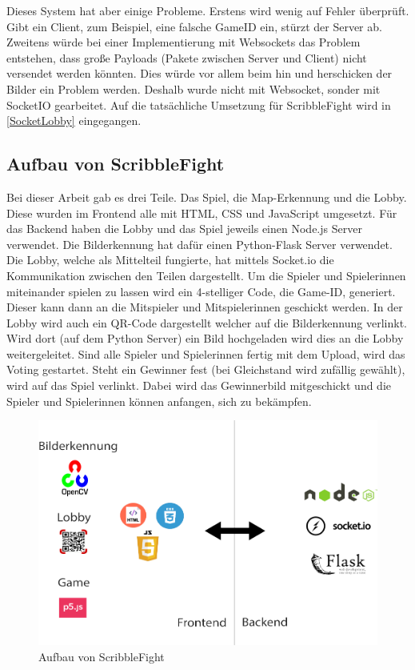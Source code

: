 Dieses System hat aber einige Probleme. Erstens wird wenig auf Fehler überprüft.
Gibt ein Client, zum Beispiel, eine falsche GameID ein, stürzt der Server ab. Zweitens würde bei einer Implementierung mit
Websockets das Problem entstehen, dass große Payloads (Pakete zwischen Server und Client) nicht versendet werden könnten.
Dies würde vor allem beim hin und herschicken der Bilder ein Problem werden. Deshalb wurde
nicht mit Websocket, sonder mit SocketIO gearbeitet. Auf die tatsächliche Umsetzung für ScribbleFight wird in
\ref{SocketLobby} eingegangen.

\subsection{Aufbau von ScribbleFight}
Bei dieser Arbeit gab es drei Teile. Das Spiel, die Map-Erkennung und die Lobby. Diese wurden im Frontend alle mit HTML, CSS und JavaScript umgesetzt.
Für das Backend haben die Lobby und das Spiel jeweils einen Node.js Server verwendet. Die Bilderkennung hat dafür einen Python-Flask Server verwendet. Die Lobby, welche als Mittelteil fungierte, hat mittels Socket.io die Kommunikation zwischen den Teilen dargestellt.
Um die Spieler und Spielerinnen miteinander spielen zu lassen wird ein 4-stelliger Code, die Game-ID, generiert. Dieser kann dann an die Mitspieler und Mitspielerinnen geschickt werden. In der Lobby wird auch ein QR-Code dargestellt welcher auf die Bilderkennung verlinkt.
Wird dort (auf dem Python Server) ein Bild hochgeladen wird dies an die Lobby weitergeleitet. Sind alle Spieler und Spielerinnen fertig mit dem Upload, wird das Voting gestartet. Steht ein Gewinner fest (bei Gleichstand wird zufällig gewählt), wird auf das Spiel verlinkt. Dabei wird das Gewinnerbild mitgeschickt und die Spieler und Spielerinnen können anfangen, sich zu bekämpfen.
\begin{figure}[H]
    \centering
    \includegraphics[scale=0.3]{pics/architektur.png}
    \caption{Aufbau von ScribbleFight}
\end{figure}

